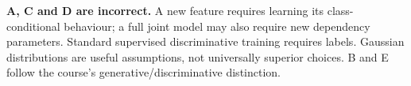 \textbf{A, C and D are incorrect.} A new feature requires learning its class-conditional behaviour; a full joint model may also require new dependency parameters. Standard supervised discriminative training requires labels. Gaussian distributions are useful assumptions, not universally superior choices. B and E follow the course's generative/discriminative distinction.
